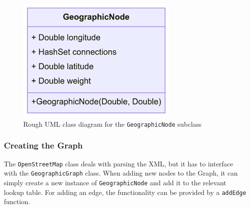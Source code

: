 \documentclass[11pt,twoside,a4paper]{report}
\begin{document}
\begin{figure}[t]
    \begin{center}
        \includegraphics[width=8cm]{GeographicNode.png}
    \end{center}
    \caption{Rough UML class diagram for the \texttt{GeographicNode} subclass}
    \label{geographicnode}
\end{figure}
\subsubsection{Creating the Graph}
The \texttt{OpenStreetMap} class deals with parsing the XML, but it has to interface with the \texttt{GeographicGraph} class. When adding new nodes to the Graph, it can simply create a new instance of 
\texttt{GeographicNode} and add it to the relevant lookup table. For adding an edge, the functionality can be provided by a \texttt{addEdge} function. 
\end{document}
